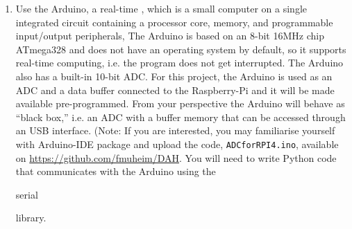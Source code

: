 \begin{enumerate}
%
%
%
%
% 

\item	Use the Arduino, a real-time \microcontroller, which  is a small computer on a single integrated circuit containing a processor core, memory, and programmable input/output peripherals, 
The Arduino is based on an 8-bit 16MHz chip ATmega328 and does not have an operating system by default, so it supports real-time computing, i.e. the program does not get interrupted. The Arduino also has a built-in 10-bit ADC. For this project, the Arduino is used as an ADC and a data buffer connected to the Raspberry-Pi and it will be made available pre-programmed. From your perspective the Arduino will behave as ``black box,'' i.e. an ADC with a buffer memory that can be accessed through an USB interface. (Note: If you are interested, you may familiarise yourself with Arduino-IDE package and upload the code, {\tt ADCforRPI4.ino},  available on  \url{https://github.com/fmuheim/DAH}. 
You will need to write Python code that communicates with the Arduino using the \begin{tt}serial\end{tt} library.\\


\end{enumerate}
